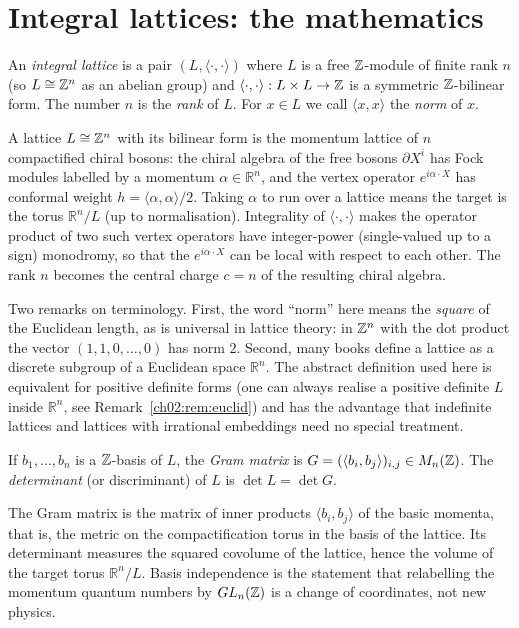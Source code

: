 \section{Integral lattices: the mathematics}\label{ch02:sec:lattices}

\begin{definition}\label{ch02:def:lattice}
An \emph{integral lattice} is a pair $(L,\langle\cdot,\cdot\rangle)$ where $L$ is a free
${\mathbb{Z}}$-module of finite rank $n$ (so $L\cong{\mathbb{Z}}^n$ as an abelian group) and
$\langle\cdot,\cdot\rangle:L\times L\to{\mathbb{Z}}$ is a symmetric ${\mathbb{Z}}$-bilinear form.  The number $n$ is
the \emph{rank} of $L$.  For $x\in L$ we call $\langle x,x\rangle$ the \emph{norm} of $x$.
\end{definition}
\begin{physics}
A lattice $L\cong{\mathbb{Z}}^n$ with its bilinear form is the momentum lattice of $n$ compactified chiral bosons: the chiral algebra of the free bosons $\partial X^i$ has Fock modules labelled by a momentum $\alpha\in\mathbb{R}^n$, and the vertex operator $e^{i\alpha\cdot X}$ has conformal weight $h=\langle\alpha,\alpha\rangle/2$. Taking $\alpha$ to run over a lattice means the target is the torus $\mathbb{R}^n/L$ (up to normalisation). Integrality of $\langle\cdot,\cdot\rangle$ makes the operator product of two such vertex operators have integer-power (single-valued up to a sign) monodromy, so that the $e^{i\alpha\cdot X}$ can be local with respect to each other. The rank $n$ becomes the central charge $c=n$ of the resulting chiral algebra.
\end{physics}

Two remarks on terminology.  First, the word ``norm'' here means the \emph{square} of the
Euclidean length, as is universal in lattice theory: in ${\mathbb{Z}}^n$ with the dot product the vector
$(1,1,0,\dots,0)$ has norm $2$.  Second, many books define a lattice as a discrete subgroup of a
Euclidean space $\mathbb{R}^n$.  The abstract definition used here is equivalent for positive
definite forms (one can always realise a positive definite $L$ inside $\mathbb{R}^n$, see
Remark~\ref{ch02:rem:euclid}) and has the advantage that indefinite lattices and lattices with
irrational embeddings need no special treatment.

\begin{definition}\label{ch02:def:gram}
If $b_1,\dots,b_n$ is a ${\mathbb{Z}}$-basis of $L$, the \emph{Gram matrix} is
$G=(\langle b_i,b_j\rangle)_{i,j}\in M_n({\mathbb{Z}})$.  The \emph{determinant} (or discriminant) of $L$ is
$\det L=\det G$.
\end{definition}
\begin{physics}
The Gram matrix is the matrix of inner products $\langle b_i,b_j\rangle$ of the basic momenta, that is, the metric on the compactification torus in the basis of the lattice. Its determinant measures the squared covolume of the lattice, hence the volume of the target torus $\mathbb{R}^n/L$. Basis independence is the statement that relabelling the momentum quantum numbers by $GL_n({\mathbb{Z}})$ is a change of coordinates, not new physics.
\end{physics}

